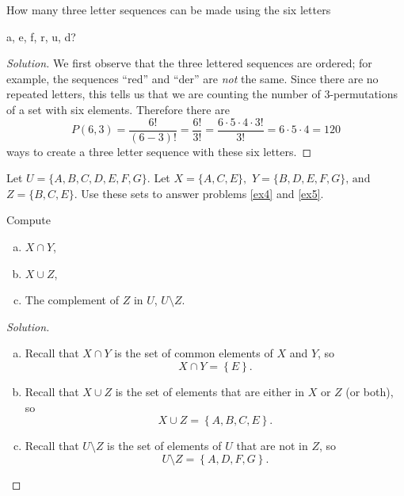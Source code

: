 \documentclass[12pt]{amsart}
\begin{document}
\newpage

\begin{thm}[12 Points]\label{ex3}
  How many three letter sequences can be made using the six letters 
  \begin{center}a, e, f, r, u, d?\end{center}
  \begin{proof}[Solution]
    We first observe that the three lettered sequences are ordered; for example, the sequences ``red'' and ``der'' are {\it not} the same.
    Since there are no repeated letters, this tells us that we are counting the number of 3-permutations of a set with six elements.
    Therefore there are
    $$P(6,3) = \frac{6!}{(6 - 3)!} = \frac{6!}{3!} = \frac{6 \cdot 5 \cdot 4 \cdot 3!}{3!} = 6 \cdot 5 \cdot 4 = 120$$
    ways to create a three letter sequence with these six letters.
  \end{proof}
\end{thm}

\newpage

\noindent Let $U = \{A, B, C, D, E, F, G\}$.
  Let 
  $X = \{A,C,E\},$
  $Y = \{B, D, E, F, G\},\, \text{and}$
  $Z = \{B, C, E\}.$
  Use these sets to answer problems \ref{ex4} and \ref{ex5}.
\begin{thm}[18 Points]\label{ex4}
  Compute
  \begin{enumerate}[(a)]
  \item
    $X \cap Y$,
  \item
    $X \cup Z$,
  \item
    The complement of $Z$ in $U$, $U \setminus Z$.
  \end{enumerate}
  \begin{proof}[Solution]
    \begin{enumerate}[(a)]
    \item
      Recall that $X \cap Y$ is the set of common elements of $X$ and $Y$, so
      $$X \cap Y = \left\{ E\right\}.$$
    \item
      Recall that $X \cup Z$ is the set of elements that are either in $X$ or $Z$ (or both), so 
      $$X \cup Z = \left\{A,B,C,E\right\}.$$
    \item
      Recall that $U \setminus Z$ is the set of elements of $U$ that are not in $Z$, so
      $$U \setminus Z = \left\{A, D,F,G\right\}.$$
    \end{enumerate}
  \end{proof}
\end{thm}

\newpage
\end{document}
